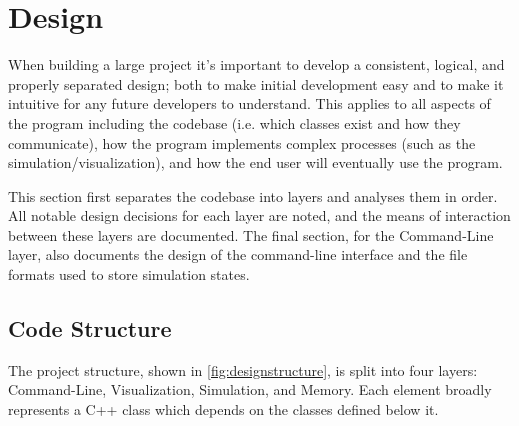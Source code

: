 
\chapter{Design}
\label{sec:Design} 

When building a large project it's important to develop a consistent, logical, and properly separated design; both to make initial development easy and to make it intuitive for any future developers to understand.
This applies to all aspects of the program including the codebase (i.e. which classes exist and how they communicate), how the program implements complex processes (such as the simulation/visualization), and how the end user will eventually use the program.

This section first separates the codebase into layers and analyses them in order.
All notable design decisions for each layer are noted, and the means of interaction between these layers are documented.
The final section, for the Command-Line layer, also documents the design of the command-line interface and the file formats used to store simulation states.


\section{Code Structure}
The project structure, shown in \cref{fig:designstructure}, is split into four layers: Command-Line, Visualization, Simulation, and Memory.
Each element broadly represents a C++ class which depends on the classes defined below it.


